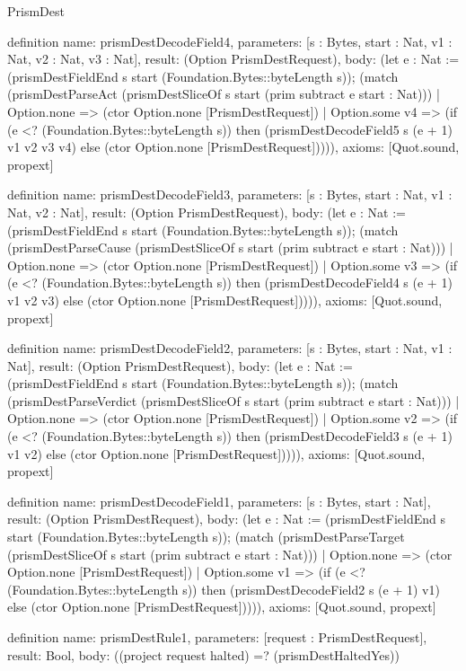 \begin{lexlean}{PrismDest}
\begin{semanticmodule}
definition{
  name: prismDestDecodeField4,
  parameters: [s : Bytes, start : Nat, v1 : Nat, v2 : Nat, v3 : Nat],
  result: (Option PrismDestRequest),
  body: (let e : Nat := (prismDestFieldEnd s start (Foundation.Bytes::byteLength s)); (match (prismDestParseAct (prismDestSliceOf s start (prim subtract e start : Nat)))
    | Option.none => (ctor Option.none [PrismDestRequest])
    | Option.some v4 => (if (e <? (Foundation.Bytes::byteLength s)) then (prismDestDecodeField5 s (e + 1) v1 v2 v3 v4) else (ctor Option.none [PrismDestRequest])))),
  axioms: [Quot.sound, propext]
}

definition{
  name: prismDestDecodeField3,
  parameters: [s : Bytes, start : Nat, v1 : Nat, v2 : Nat],
  result: (Option PrismDestRequest),
  body: (let e : Nat := (prismDestFieldEnd s start (Foundation.Bytes::byteLength s)); (match (prismDestParseCause (prismDestSliceOf s start (prim subtract e start : Nat)))
    | Option.none => (ctor Option.none [PrismDestRequest])
    | Option.some v3 => (if (e <? (Foundation.Bytes::byteLength s)) then (prismDestDecodeField4 s (e + 1) v1 v2 v3) else (ctor Option.none [PrismDestRequest])))),
  axioms: [Quot.sound, propext]
}

definition{
  name: prismDestDecodeField2,
  parameters: [s : Bytes, start : Nat, v1 : Nat],
  result: (Option PrismDestRequest),
  body: (let e : Nat := (prismDestFieldEnd s start (Foundation.Bytes::byteLength s)); (match (prismDestParseVerdict (prismDestSliceOf s start (prim subtract e start : Nat)))
    | Option.none => (ctor Option.none [PrismDestRequest])
    | Option.some v2 => (if (e <? (Foundation.Bytes::byteLength s)) then (prismDestDecodeField3 s (e + 1) v1 v2) else (ctor Option.none [PrismDestRequest])))),
  axioms: [Quot.sound, propext]
}

definition{
  name: prismDestDecodeField1,
  parameters: [s : Bytes, start : Nat],
  result: (Option PrismDestRequest),
  body: (let e : Nat := (prismDestFieldEnd s start (Foundation.Bytes::byteLength s)); (match (prismDestParseTarget (prismDestSliceOf s start (prim subtract e start : Nat)))
    | Option.none => (ctor Option.none [PrismDestRequest])
    | Option.some v1 => (if (e <? (Foundation.Bytes::byteLength s)) then (prismDestDecodeField2 s (e + 1) v1) else (ctor Option.none [PrismDestRequest])))),
  axioms: [Quot.sound, propext]
}

definition{
  name: prismDestRule1,
  parameters: [request : PrismDestRequest],
  result: Bool,
  body: ((project request halted) =? (prismDestHaltedYes))
}


\end{semanticmodule}
\end{lexlean}
